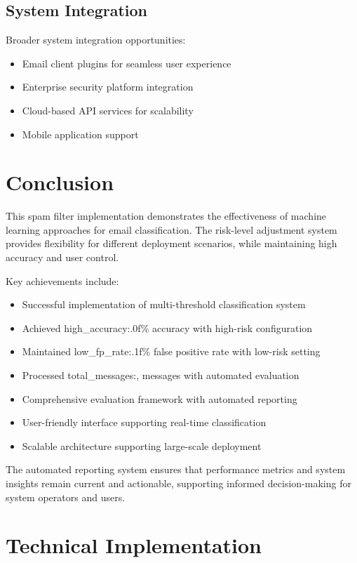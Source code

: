 \documentclass[12pt,a4paper]{article}
\begin{document}
\subsection{System Integration}

Broader system integration opportunities:
\begin{itemize}
    \item Email client plugins for seamless user experience
    \item Enterprise security platform integration
    \item Cloud-based API services for scalability
    \item Mobile application support
\end{itemize}

\section{Conclusion}

This spam filter implementation demonstrates the effectiveness of machine learning approaches for email classification. The risk-level adjustment system provides flexibility for different deployment scenarios, while maintaining high accuracy and user control.

Key achievements include:
\begin{itemize}
    \item Successful implementation of multi-threshold classification system
    \item Achieved {high_accuracy:.0f}\% accuracy with high-risk configuration
    \item Maintained {low_fp_rate:.1f}\% false positive rate with low-risk setting
    \item Processed {total_messages:,} messages with automated evaluation
    \item Comprehensive evaluation framework with automated reporting
    \item User-friendly interface supporting real-time classification
    \item Scalable architecture supporting large-scale deployment
\end{itemize}

The automated reporting system ensures that performance metrics and system insights remain current and actionable, supporting informed decision-making for system operators and users.

\section{Technical Implementation}
\end{document}
